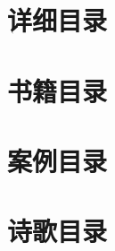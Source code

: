 \documentclass{ctexart}
\begin{document}
\clearpage\appendix

\section{详细目录}

\setcounter{tocdepth}{4}
\renewcommand*{\contentsname}{}
\begin{multicols}{2}
    \tableofcontents
\end{multicols}

\section{书籍目录}
\renewcommand*{\listtheoremname}{}
\begin{multicols}{2}
    \listoftheorems[ignoreall, show = book]
\end{multicols}

\section{案例目录}
\renewcommand*{\listtheoremname}{}
\begin{multicols}{2}
    \listoftheorems[ignoreall, show = case]
\end{multicols}

\section{诗歌目录}
\renewcommand*{\listtheoremname}{}
\begin{multicols}{2}
    \listoftheorems[ignoreall, show = poem]
\end{multicols}
\end{document}
